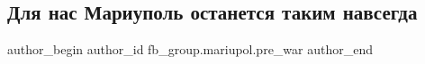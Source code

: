  
 
 
 
 

\subsection{Для нас Мариуполь останется таким навсегда}
\label{sec:24_02_2023.fb.fb_group.mariupol.pre_war.3.dlya_nas_mariupol_os}

\ifcmt
 author_begin
   author_id fb_group.mariupol.pre_war
 author_end
\fi
